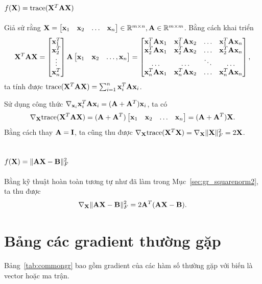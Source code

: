 \subsection{$f(\bX) = \trace(\bX^T\bA\bX)$}
Giả sử rằng $\bX = \bmt \bx_1 & \bx_2 & \dots & \bx_n \emt \in \R^{m\times n},
\bA \in \R^{m\times m}$. Bằng cách khai triển
\begin{equation*}
\bX^T\bA\bX = \bmt \bx_1^T \\ \bx_2^T \\ \vdots \\ \bx_n^T \emt \bA \bmt
\bx_1 & \bx_2 & \dots, \bx_n \emt = \bmt
\bx_1^T\bA\bx_1 & \bx_1^T\bA\bx_2 & \dots & \bx_1^T\bA\bx_n \\
\bx_2^T\bA\bx_1 & \bx_2^T\bA\bx_2 & \dots & \bx_2^T\bA\bx_n \\
\dots & \dots & \ddots & \dots \\
\bx_n^T\bA\bx_1 & \bx_n^T\bA\bx_2 & \dots & \bx_n^T\bA\bx_n
\emt,
\end{equation*}
ta tính được $\trace(\bX^T\bA\bX) = \sum_{i=1}^n \bx_i^T\bA\bx_i$.

Sử dụng công thức $\nabla_{\bx_i}\bx_i^T\bA\bx_i = (\bA + \bA^T)\bx_i$, ta có
\begin{equation}
\nabla_{\bX} \trace(\bX^T\bA\bX) = (\bA + \bA^T) \bmt \bx_1 & \bx_2 & \dots &
\bx_n \emt = (\bA + \bA^T)\bX.
\end{equation}
Bằng cách thay $\bA = \bI$, ta cũng thu được $\nabla_{\bX}\trace(\bX^T\bX) =
\nabla_{\bX} \|\bX\|_F^2 = 2\bX$.

\subsection{$f(\bX) = \|\bA\bX - \bB\|_F^2$}
Bằng kỹ thuật hoàn toàn tương tự như đã làm trong Mục~\ref{sec:gr_squarenorm2},
ta thu được $$\nabla_{\bX} \|\bA\bX - \bB\|_F^2 = 2\bA^T(\bA\bX - \bB).$$


\section{Bảng các gradient thường gặp}


Bảng~\ref{tab:commongr} bao gồm gradient của các hàm số thường gặp với biến là
vector hoặc ma trận.


